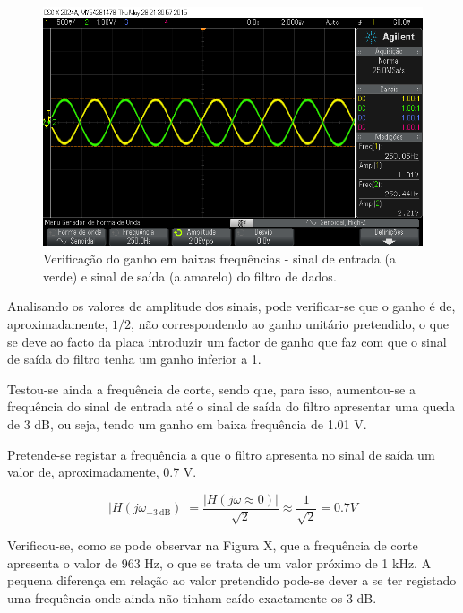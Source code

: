 \documentclass[11pt]{article}
\numberwithin{equation}{section}
\begin{document}
{\begin{figure}[H]
	\centering
	\includegraphics[keepaspectratio=true, scale=0.37]{exps/filtro_1k_baixafreq}
	\caption{Verificação do ganho em baixas frequências - sinal de entrada (a verde) e sinal de saída (a amarelo) do filtro de dados.}
	\vspace{-0.8em}
\end{figure} 

Analisando os valores de amplitude dos sinais, pode verificar-se que o ganho é de, aproximadamente, $1/2$, não correspondendo ao ganho unitário pretendido, o que se deve ao facto da placa introduzir um factor de ganho que faz com que o sinal de saída do filtro tenha um ganho inferior a 1. 

Testou-se ainda a frequência de corte, sendo que, para isso, aumentou-se a frequência do sinal de entrada até o sinal de saída do filtro apresentar uma queda de 3 dB, ou seja, tendo um ganho em baixa frequência de 1.01 V. 

Pretende-se registar a frequência a que o filtro apresenta no sinal de saída um valor de, aproximadamente, 0.7 V.

\vspace{-3mm}
\begin{equation}
	|H(j\omega_{-3~\text{dB}})| = \frac{|H(j\omega \approx 0)|}{\sqrt{2}} \approx \frac{1}{\sqrt{2}} = 0.7 V
\end{equation} 

\vspace{1mm}
Verificou-se, como se pode observar na Figura X, que a frequência de corte apresenta o valor de 963 Hz, o que se trata de um valor próximo de 1 kHz. A pequena diferença em relação ao valor pretendido pode-se dever a se ter registado uma frequência onde ainda não tinham caído exactamente os 3 dB.

}
\end{document}
